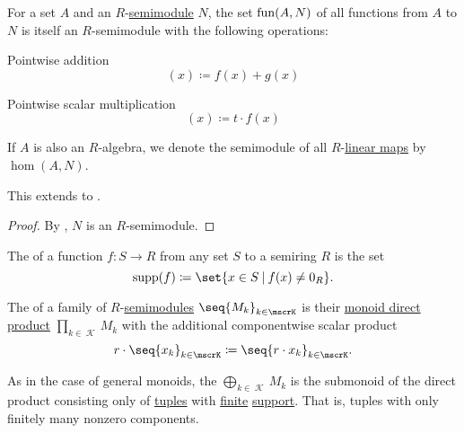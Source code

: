 \begin{proposition}\label{thm:functions_over_semimodule}
  For a set \( A \) and an \( R \)-\hyperref[def:semimodule]{semimodule} \( N \), the set \( \operatorname{fun}(A, N) \) of all functions from \( A \) to \( N \) is itself an \( R \)-semimodule with the following operations:
  \begin{thmenum}
     Pointwise addition
    \begin{equation*}
      [f + g](x) \coloneqq f(x) + g(x)
    \end{equation*}

     Pointwise scalar multiplication
    \begin{equation*}
      [t \cdot f](x) \coloneqq t \cdot f(x)
    \end{equation*}
  \end{thmenum}

  If \( A \) is also an \( R \)-algebra, we denote the semimodule of all \( R \)-\hyperref[def:semimodule/homomorphism]{linear maps} by \( \hom(A, N) \).

  This extends to .
\end{proposition}
\begin{proof}
  By , \( N \) is an \( R \)-semimodule.
\end{proof}

\begin{definition}\label{def:function_support}
  The  of a function \( f: S \to R \) from any set \( S \) to a semiring \( R \) is the set
  \begin{equation*}
    \supp(f) \coloneqq \set{ x \in S \given f(x) \neq 0_R }.
  \end{equation*}
\end{definition}

\begin{definition}\label{def:semimodule_direct_product}
  The  of a family of \( R \)-\hyperref[def:semimodule]{semimodules} \( \seq{ M_k }_{k \in \mscrK} \) is their \hyperref[def:monoid_direct_product]{monoid direct product} \( \prod_{k \in \mscrK} M_k \) with the additional componentwise scalar product
  \begin{equation*}
    r \cdot \seq{ x_k }_{k \in \mscrK}
    \coloneqq
    \seq{ r \cdot x_k }_{k \in \mscrK}.
  \end{equation*}

  As in the case of general monoids, the  \( \bigoplus_{k \in \mscrK} M_k \) is the submonoid of the direct product consisting only of \hyperref[def:cartesian_product/tuple]{tuples} with \hyperref[def:set_finiteness]{finite} \hyperref[def:function_support]{support}. That is, tuples with only finitely many nonzero components.
\end{definition}

